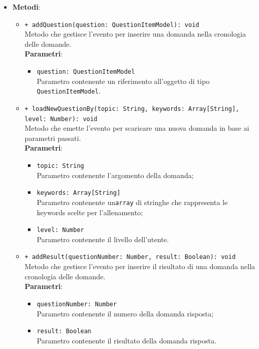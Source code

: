 \begin{itemize}
\begin{itemize}
		\end{itemize}
		\item \textbf{Metodi}: 
		\begin{itemize}
			\item \texttt{+ addQuestion(question: QuestionItemModel): void} \\
			Metodo che gestisce l'evento per inserire una domanda nella cronologia delle domande. \\
			\textbf{Parametri}:
			\begin{itemize}
				\item \texttt{question: QuestionItemModel} \\
				Parametro contenente un riferimento all'oggetto di tipo \texttt{QuestionItemModel}.
			\end{itemize}
			\item \texttt{+ loadNewQuestionBy(topic: String, keywords: Array[String], level: Number): void} \\
			Metodo che emette l'evento per scaricare una nuova domanda in base ai parametri passati. \\
			\textbf{Parametri}:
			\begin{itemize}
				\item \texttt{topic: String} \\
				Parametro contenente l'argomento della domanda;
				\item \texttt{keywords: Array[String]} \\
				Parametro contenente un\texttt{array} di stringhe che rappresenta le keywords scelte per l'allenamento;
				\item \texttt{level: Number} \\
				Parametro contenente il livello dell'utente.
			\end{itemize}
			\item \texttt{+ addResult(questionNumber: Number, result: Boolean): void} \\
			Metodo che gestisce l'evento per inserire il risultato di una domanda nella cronologia delle domande. \\
			\textbf{Parametri}:
			\begin{itemize}
				\item \texttt{questionNumber: Number} \\
				Parametro contenente il numero della domanda risposta;
				\item \texttt{result: Boolean} \\
				Parametro contenente il risultato della domanda risposta.
			\end{itemize}

\end{itemize}
\end{itemize}

